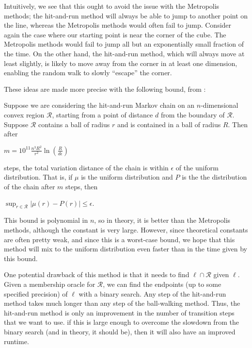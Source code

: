 \documentclass[11pt]{article}
\begin{document}
Intuitively, we see that this ought to avoid the issue with the Metropolis methods; the hit-and-run method will always be able to jump to another point on the line, whereas the Metropolis methods would often fail to jump. Consider again the case where our starting point is near the corner of the cube. The Metropolis methods would fail to jump all but an exponentially small fraction of the time. On the other hand, the hit-and-run method, which will always move at least slightly, is likely to move away from the corner in at least one dimension, enabling the random walk to slowly ``escape'' the corner.

These ideas are made more precise with the following bound, from \cite{Vempala}:

\begin{theorem} \label{hitandrunbound} Suppose we are considering the hit-and-run Markov chain on an $n$-dimensional convex region $\mathcal{R}$, starting from a point of distance $d$ from the boundary of $\mathcal{R}$. Suppose $\mathcal{R}$ contains a ball of radius $r$ and is contained in a ball of radius $R$. Then after
\begin{center}$m = \displaystyle 10^{11}\frac{ n^3 R^2}{r^2}\ln\left(\frac{R}{d\epsilon}\right)$\end{center}
steps, the total variation distance of the chain is within $\epsilon$ of the uniform distribution. That is, if $\mu$ is the uniform distribution and $P$ is the the distribution of the chain after $m$ steps, then
\begin{center}$\displaystyle \sup_{r \in \mathcal{R}} |\mu(r) - P(r)| \le \epsilon$.\end{center}
\end{theorem}

This bound is polynomial in $n$, so in theory, it is better than the Metropolis methods, although the constant is very large. However, since theoretical constants are often pretty weak, and since this is a worst-case bound, we hope that this method will mix to the uniform distribution even faster than in the time given by this bound.

One potential drawback of this method is that it needs to find $\ell \cap \mathcal{R}$ given $\ell$. Given a membership oracle for $\mathcal{R}$, we can find the endpoints (up to some specified precision) of $\ell$ with a binary search. Any step of the hit-and-run method takes much longer than any step of the ball-walking method. Thus, the hit-and-run method is only an improvement in the number of transition steps that we want to use. if this is large enough to overcome the slowdown from the binary search (and in theory, it should be), then it will also have an improved runtime.
\end{document}
